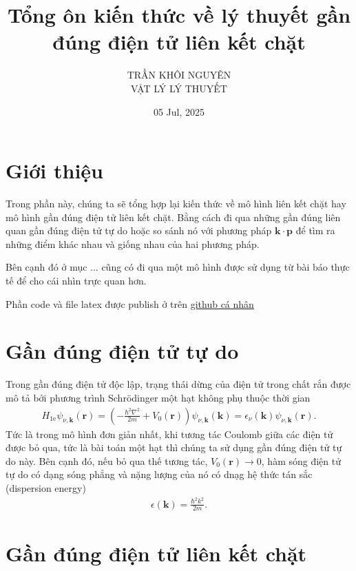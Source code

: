 \documentclass{article}
\title{\Huge{Tổng ôn kiến thức về lý thuyết gần đúng điện tử liên kết chặt}}
\begin{document}
\setlength{\parindent}{20pt}
\newpage
\date{05 Jul, 2025}
\author{TRẦN KHÔI NGUYÊN \\ VẬT LÝ LÝ THUYẾT}
\maketitle
\section{Giới thiệu}
Trong phần này, chúng ta sẽ tổng hợp lại kiến thức về mô hình liên kết chặt hay mô hình gần đúng điện tử liên kết chặt. Bằng cách đi qua những gần đúng liên quan gần đúng điện tử tự do hoặc so sánh nó với phương pháp $\mathbf{k} \cdot \mathbf{p}$ để tìm ra những điểm khác nhau và giống nhau của hai phương pháp.

Bên cạnh đó ở mục ... cũng có đi qua một mô hình được sử dụng từ bài báo thực tế để cho cái nhìn trực quan hơn.

Phần code và file latex được publish ở trên
\href{https://github.com/nguyn21012003/ReviewTBM}{github cá nhân}

\section{Gần đúng điện tử tự do}
Trong gần đúng điện tử độc lập, trạng thái dừng của điện tử trong chất rắn được mô tả bởi phương trình Schr\"{o}dinger một hạt không phụ thuộc thời gian
\begin{gather}
	H_{\text{1e}} \psi_{\nu,\mathbf{k}} (\mathbf{r}) = \left(-\frac{\hbar^{2} \nabla^{2}}{2m} + V_{0}(\mathbf{r})\right) \psi_{\nu,\mathbf{k}}(\mathbf{k}) = \epsilon_{\nu}(\mathbf{k}) \psi_{\nu,\mathbf{k}}(\mathbf{r}).
\end{gather}
Tức là trong mô hình đơn giản nhất, khi tương tác Coulomb giữa các điện tử được bỏ qua, tức là bài toán một hạt thì chúng ta sử dụng gần đúng điện tử tự do này. Bên cạnh đó, nếu bỏ qua thế tương tác, $V_{0}(\mathbf{r}) \to 0$, hàm sóng điện tử tự do có dạng sóng phẳng và nặng lượng của nó có dnạg hệ thức tán sắc (dispersion energy)
\begin{gather}
	\epsilon(\mathbf{k}) = \frac{\hbar^{2} k^{2}}{2m}.
\end{gather}

\section{Gần đúng điện tử liên kết chặt}
\end{document}
